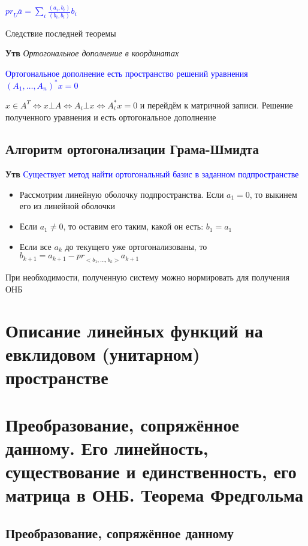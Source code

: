 \documentclass[a4paper, 14pt]{article}
\begin{document}
    \textcolor{blue}{${pr}_U \overline{a} = \sum_i \frac{(a_i, b_i)}{(b_i, b_i)} b_i$}
    
    Следствие последней теоремы
    
    \textbf{Утв} \textit{Ортогональное дополнение в координатах}
    
    \textcolor{blue}{Ортогональное дополнение есть пространство решений уравнения $(A_1, \dots, A_n)^* x = 0$}
    
    $x \in A^T \Leftrightarrow x \bot A \Leftrightarrow A_i \bot x \Leftrightarrow A_i^* x = 0$ и перейдём к матричной
    записи.
    Решение полученного уравнения и есть ортогональное дополнение
    
    \subsection{Алгоритм ортогонализации Грама-Шмидта}
    
    \textbf{Утв} \textcolor{blue}{Существует метод найти ортогональный базис в заданном подпространстве}
    
    \begin{itemize}
        \item Рассмотрим линейную оболочку подпространства.
        Если $a_1 = 0$, то выкинем его из линейной оболочки
        \item Если $a_1 \neq 0$, то оставим его таким, какой он есть: $b_1 = a_1$
        \item Если все $a_k$ до текущего уже ортогонализованы, то $b_{k+1} = a_{k+1} - {pr}_{<b_1, \dots, b_k>} a_{k+1}$
    \end{itemize}
    
    При необходимости, полученную систему можно нормировать для получения ОНБ
    
    \section{Описание линейных функций на евклидовом (унитарном) пространстве}
    
    \section{Преобразование, сопряжённое данному.
    Его линейность, существование и единственность, его матрица в ОНБ.
    Теорема Фредгольма}
    
    \subsection{Преобразование, сопряжённое данному}
    
\end{document}
